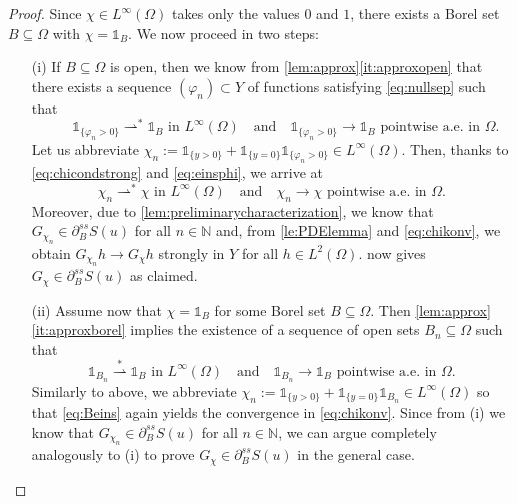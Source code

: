 \documentclass[reqno]{shinyart}
\begin{document}
\begin{proof}
    Since $\chi \in L^\infty(\Omega)$ takes only the values $0$ and $1$, 
    there exists a Borel set $B  \subseteq \Omega$ with $\chi = \mathbb{1}_B$.  
    We now proceed in two steps:
    \begin{itemize}
        \item[(i)] If $B\subseteq\Omega$ is open, then we know from  
            \cref{lem:approx}\ref{it:approxopen} that there exists a sequence $(\varphi_n) \subset Y$ 
            of functions satisfying \eqref{eq:nullsep} such that 
            \begin{equation}\label{eq:einsphi}
                \qquad \mathbb{1}_{\{\varphi_n > 0\}} {\rightharpoonup}^{*} \mathbb{1}_B 
                \text{ in }L^\infty(\Omega) 
                \quad \text{and}\quad 
                \mathbb{1}_{\{\varphi_n > 0\}} \to \mathbb{1}_{B}\text{ pointwise a.e.\ in }\Omega.
            \end{equation}
            Let us abbreviate $\chi_n := \mathbb{1}_{\{y>0\}} 
            + \mathbb{1}_{\{y=0\} }\mathbb{1}_{\{\varphi_n > 0\}} \in L^\infty(\Omega)$.
            Then, thanks to \eqref{eq:chicondstrong} and \eqref{eq:einsphi}, we arrive at
            \begin{equation}\label{eq:chikonv}
                \chi_n {\rightharpoonup}^{*}  \chi \text{ in }L^\infty(\Omega) 
                \quad \text{and}\quad 
                \chi_n \to  \chi \text{ pointwise a.e.\ in }\Omega.  
            \end{equation}
            Moreover, due to \cref{lem:preliminarycharacterization}, we know that
            $G_{\chi_n} \in  \partial_B^{ss} S(u)$ for all $n\in{\mathbb{N}}$ and, 
            from \cref{le:PDElemma} and \eqref{eq:chikonv}, we obtain 
            $G_{\chi_n} h  \to G_{\chi} h$ strongly in $Y$ for all $h \in L^2(\Omega)$. 
             now gives $G_{\chi} \in \partial_B^{ss} S(u)$ as claimed. 
        \item[(ii)] Assume now that $\chi = \mathbb{1}_B$ for some Borel set $B \subseteq \Omega$. 
            Then \cref{lem:approx}\ref{it:approxborel} implies the existence of a sequence of 
            open sets $B_n \subseteq \Omega$ such that
            \begin{equation}\label{eq:Beins}
                \mathbb{1}_{B_n} \overset{*}{\rightharpoonup} \mathbb{1}_B 
                \text{ in }L^\infty(\Omega)
                \quad \text{and}\quad \mathbb{1}_{B_n} \to  \mathbb{1}_{B}
                \text{ pointwise a.e.\ in }\Omega.  
            \end{equation}
            Similarly to above, we abbreviate $\chi_n := \mathbb{1}_{\{y>0\}} 
            + \mathbb{1}_{\{y=0\} }\mathbb{1}_{B_n} \in L^\infty(\Omega)$ so that 
            \eqref{eq:Beins} again yields the convergence in \eqref{eq:chikonv}. 
            Since from (i) we know  that $G_{\chi_n} \in \partial_B^{ss} S(u)$ for all $n\in{\mathbb{N}}$, 
            we can argue completely analogously to (i) to prove $G_{\chi} \in \partial_B^{ss} S(u)$ 
            in the general case. 
            \qedhere
    \end{itemize}
\end{proof}
\end{document}
